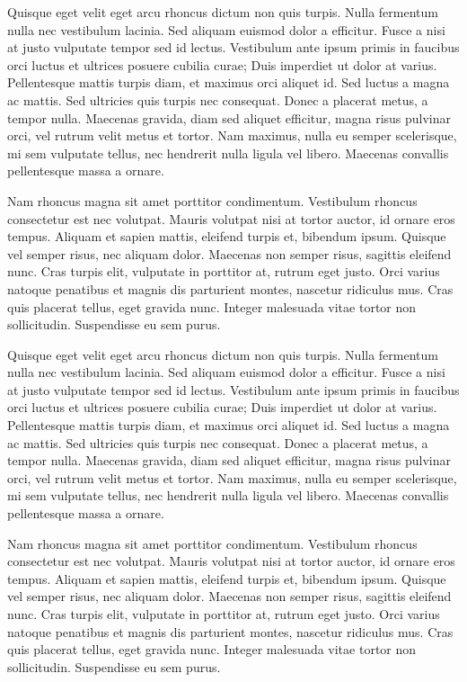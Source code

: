 \documentclass[a4paper]{article}
\begin{document}
    \begin{answer}
        Quisque eget velit eget arcu rhoncus dictum non quis turpis. Nulla fermentum nulla nec vestibulum lacinia. Sed aliquam euismod dolor a efficitur. Fusce a nisi at justo vulputate tempor sed id lectus. Vestibulum ante ipsum primis in faucibus orci luctus et ultrices posuere cubilia curae; Duis imperdiet ut dolor at varius. Pellentesque mattis turpis diam, et maximus orci aliquet id. Sed luctus a magna ac mattis. Sed ultricies quis turpis nec consequat. Donec a placerat metus, a tempor nulla. Maecenas gravida, diam sed aliquet efficitur, magna risus pulvinar orci, vel rutrum velit metus et tortor. Nam maximus, nulla eu semper scelerisque, mi sem vulputate tellus, nec hendrerit nulla ligula vel libero. Maecenas convallis pellentesque massa a ornare.

            Nam rhoncus magna sit amet porttitor condimentum. Vestibulum rhoncus consectetur est nec volutpat. Mauris volutpat nisi at tortor auctor, id ornare eros tempus. Aliquam et sapien mattis, eleifend turpis et, bibendum ipsum. Quisque vel semper risus, nec aliquam dolor. Maecenas non semper risus, sagittis eleifend nunc. Cras turpis elit, vulputate in porttitor at, rutrum eget justo. Orci varius natoque penatibus et magnis dis parturient montes, nascetur ridiculus mus. Cras quis placerat tellus, eget gravida nunc. Integer malesuada vitae tortor non sollicitudin. Suspendisse eu sem purus.
    \end{answer}

    \begin{answer}
        Quisque eget velit eget arcu rhoncus dictum non quis turpis. Nulla fermentum nulla nec vestibulum lacinia. Sed aliquam euismod dolor a efficitur. Fusce a nisi at justo vulputate tempor sed id lectus. Vestibulum ante ipsum primis in faucibus orci luctus et ultrices posuere cubilia curae; Duis imperdiet ut dolor at varius. Pellentesque mattis turpis diam, et maximus orci aliquet id. Sed luctus a magna ac mattis. Sed ultricies quis turpis nec consequat. Donec a placerat metus, a tempor nulla. Maecenas gravida, diam sed aliquet efficitur, magna risus pulvinar orci, vel rutrum velit metus et tortor. Nam maximus, nulla eu semper scelerisque, mi sem vulputate tellus, nec hendrerit nulla ligula vel libero. Maecenas convallis pellentesque massa a ornare.

        Nam rhoncus magna sit amet porttitor condimentum. Vestibulum rhoncus consectetur est nec volutpat. Mauris volutpat nisi at tortor auctor, id ornare eros tempus. Aliquam et sapien mattis, eleifend turpis et, bibendum ipsum. Quisque vel semper risus, nec aliquam dolor. Maecenas non semper risus, sagittis eleifend nunc. Cras turpis elit, vulputate in porttitor at, rutrum eget justo. Orci varius natoque penatibus et magnis dis parturient montes, nascetur ridiculus mus. Cras quis placerat tellus, eget gravida nunc. Integer malesuada vitae tortor non sollicitudin. Suspendisse eu sem purus.
    \end{answer}
\end{document}
